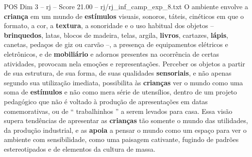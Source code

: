 \begin{textsample}{POS Dim 3 – rj – Score 21.00 – rj/rj\_inf\_camp\_exp\_8.txt}
O ambiente envolve a \textbf{criança} em um mundo de \textbf{estímulos} visuais, sonoros, táteis, cinéticos em que o formato, a cor, a \textbf{textura}, a sonoridade e o uso habitual dos objetos – \textbf{brinquedos}, latas, blocos de madeira, telas, argila, \textbf{livros}, cartazes, \textbf{lápis}, canetas, pedaços de giz ou carvão –, a presença de equipamentos elétricos e eletrônicos, e de \textbf{mobiliário} e adornos presentes na ocorrência de certas atividades, provocam nela emoções e representações.
Perceber os objetos a partir de sua estrutura, de sua forma, de suas qualidades \textbf{sensoriais}, e não apenas segundo sua utilização imediata, possibilita às \textbf{crianças} ver o mundo como uma soma de \textbf{estímulos} e não como mera série de utensílios, dentro de um projeto pedagógico que não é voltado à produção de apresentações em datas comemorativas, ou de “ trabalhinhos ” a serem levados para casa.
Essa visão supera tendências de apresentar as \textbf{crianças} tão somente o mundo das utilidades, da produção industrial, e as \textbf{apoia} a pensar o mundo como um espaço para ver o ambiente com sensibilidade, como uma paisagem cativante, fugindo de padrões estereotipados e de elementos da cultura de massa.

\end{textsample}
